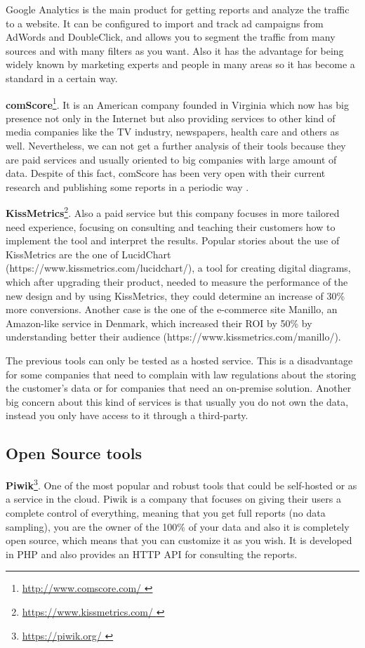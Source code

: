 \documentclass[preprint,12pt,3p]{elsarticle}
\begin{document}
Google Analytics is the main product for getting reports and analyze the traffic to a website. It can be configured to import and track ad campaigns from AdWords and DoubleClick, and allows you to segment the traffic from many sources and with many filters as you want. Also it has the advantage for being widely known by marketing experts and people in many areas so it has become a standard in a certain way.

\textbf{comScore}\footnote{\url{ http://www.comscore.com/ }}.
It is an American company founded in Virginia which now has big presence not only in the Internet but also providing services to other kind of media companies like the TV industry, newspapers, health care and others as well. Nevertheless, we can not get a further analysis of their tools because they are paid services and usually oriented to big companies with large amount of data. Despite of this fact, comScore has been very open with their current research and publishing some reports in a periodic way \cite{comScoreIVT, BrianPugh2012}.

\textbf{KissMetrics}\footnote{\url { https://www.kissmetrics.com/ }}.
Also a paid service but this company focuses in more tailored need experience, focusing on consulting and teaching their customers how to implement the tool and interpret the results. Popular stories about the use of KissMetrics are the one of LucidChart (https://www.kissmetrics.com/lucidchart/), a tool for creating digital diagrams, which after upgrading their product, needed to measure the performance of the new design and by using KissMetrics, they could determine an increase of 30\% more conversions. Another case is the one of the e-commerce site Manillo, an Amazon-like service in Denmark, which increased their ROI by 50\% by understanding better their audience (https://www.kissmetrics.com/manillo/).


The previous tools can only be tested as a hosted service. This is a disadvantage for some companies that need to complain with law regulations about the storing the customer's data or for companies that need an on-premise solution. Another big concern about this kind of services is that usually you do not own the data, instead you only have access to it through a third-party.

\subsection{Open Source tools}                                                                                               
\textbf{Piwik}\footnote{\url{ https://piwik.org/ }}.
One of the most popular and robust tools that could be self-hosted or as a service in the cloud. Piwik is a company that focuses on giving their users a complete control of everything, meaning that you get full reports (no data sampling), you are the owner of the 100\% of your data and also it is completely open source, which means that you can customize it as you wish. It is developed in PHP and also provides an HTTP API for consulting the reports.
\end{document}
